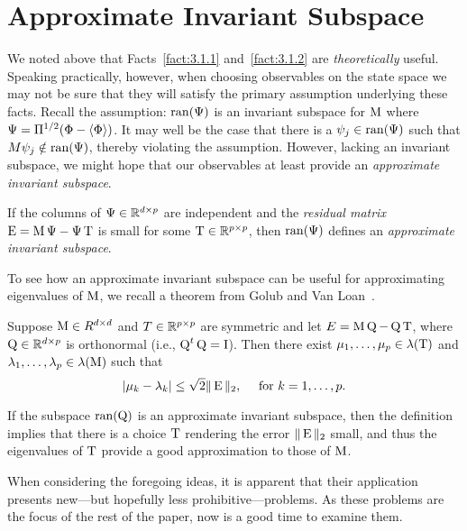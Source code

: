 \section{Approximate Invariant Subspace}
\label{sec:appr-invar-subsp}
We noted above that Facts~\ref{fact:3.1.1} and~\ref{fact:3.1.2} are
\emph{theoretically} useful. Speaking practically, however, 
when choosing observables on the state space we may not be sure that
they will satisfy the 
%
%
%
%
primary assumption underlying these facts. %
Recall the assumption: $\operatorname{ran}(\Psi)$ is an invariant
subspace for $\operatorname{M}$ where $\Psi = \Pi^{1/2}(\Phi - \langle\Phi\rangle)$. It may well be the
case that there is a $\psi_j\in \operatorname{ran}(\Psi)$ such that 
$M\psi_j \notin \operatorname{ran}(\Psi)$, thereby violating the assumption. 
However, lacking an invariant subspace, we 
might hope that our observables at least provide an \emph{approximate invariant subspace}.
\begin{definition}
If the columns of $\Psi\in \mathbb{R}^{d\times p}$ are independent and the 
\emph{residual matrix} $\operatorname{E} = \operatorname{M}\Psi - \Psi \operatorname{T}$ is small for some 
$\operatorname{T} \in \mathbb{R}^{p\times p}$, then
$\operatorname{ran}(\Psi)$ defines an \emph{approximate invariant subspace}. 
\end{definition}
To see how an approximate invariant subspace can be useful for approximating
eigenvalues of $\operatorname{M}$, we recall a theorem from Golub and Van Loan~\cite{Golub:1996}.
\begin{theorem}
\label{thm:3.2.1}  
Suppose $\operatorname{M} \in R^{d\times d}$ and $T \in \mathbb{R}^{p\times p}$ are symmetric and let
$E = \operatorname{M}\operatorname{Q} - \operatorname{Q}\operatorname{T}$, where $\operatorname{Q} \in \mathbb{R}^{d\times p}$ is orthonormal 
(i.e., $\operatorname{Q}^t\operatorname{Q} = \operatorname{I}$). Then there exist $\mu_1,\dots, \mu_p \in \lambda(\operatorname{T})$ and
$\lambda_1, \dots, \lambda_p \in \lambda(\operatorname{M})$ such that
\[
|\mu_k - \lambda_k| \leq \sqrt{2}\|\operatorname{E}\|_2, \quad \text{ for $k = 1, \dots, p$.}
\]
\end{theorem}
If the subspace $\operatorname{ran}(\operatorname{Q})$ is an approximate invariant subspace, then the definition implies that
there is a choice $\operatorname{T}$ rendering the error $\|\operatorname{E}\|_2$ small, and thus the
eigenvalues of $\operatorname{T}$ provide a good approximation to those of $\operatorname{M}$.

When considering the foregoing ideas, it is apparent that their application
presents new---but hopefully less prohibitive---problems. As these problems
are the focus of the rest of the paper, now is a good time to examine
them. 


